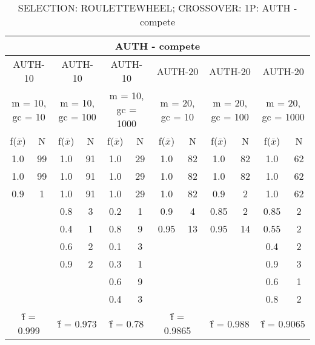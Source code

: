 \begin{table}[H]
	\centering
	\caption{SELECTION: ROULETTEWHEEL; CROSSOVER: 1P: AUTH - compete}
	\begin{adjustbox}{width=1\textwidth}
		\begin{tabular}{ |c|c||c|c||c|c||c|c||c|c||c|c| }
			\hline
			\multicolumn{12}{|c|}{AUTH - compete} \\
			\hline
			\multicolumn{2}{|c||}{AUTH-10} & \multicolumn{2}{c||}{AUTH-10} & \multicolumn{2}{c||}{AUTH-10} & \multicolumn{2}{c||}{AUTH-20} & \multicolumn{2}{c||}{AUTH-20} & \multicolumn{2}{c|}{AUTH-20}\\
			\hline
			\multicolumn{2}{|c||}{m = 10, gc = 10} & \multicolumn{2}{c||}{m = 10, gc = 100} & \multicolumn{2}{c||}{m = 10, gc = 1000} & \multicolumn{2}{c||}{m = 20, gc = 10} & \multicolumn{2}{c||}{m = 20, gc = 100} & \multicolumn{2}{c|}{m = 20, gc = 1000}\\
			\hline
			f($\bar{x}$) & N & f($\bar{x}$) & N & f($\bar{x}$) & N & f($\bar{x}$) & N & f($\bar{x}$) & N & f($\bar{x}$) & N\\
			\hline
			\hline
			1.0 & 99 & 1.0 & 91 & 1.0 & 29 & 1.0 & 82 & 1.0 & 82 & 1.0 & 62\\
			\hline
			1.0 & 99 & 1.0 & 91 & 1.0 & 29 & 1.0 & 82 & 1.0 & 82 & 1.0 & 62\\
			0.9 & 1 & 1.0 & 91 & 1.0 & 29 & 1.0 & 82 & 0.9 & 2 & 1.0 & 62\\
			&   & 0.8 & 3 & 0.2 & 1 & 0.9 & 4 & 0.85 & 2 & 0.85 & 2\\
			&   & 0.4 & 1 & 0.8 & 9 & 0.95 & 13 & 0.95 & 14 & 0.55 & 2\\
			&   & 0.6 & 2 & 0.1 & 3 &   &   &   &   & 0.4 & 2\\
			&   & 0.9 & 2 & 0.3 & 1 &   &   &   &   & 0.9 & 3\\
			&   &   &   & 0.6 & 9 &   &   &   &   & 0.6 & 1\\
			&   &   &   & 0.4 & 3 &   &   &   &   & 0.8 & 2\\
			\hline
			\multicolumn{2}{|c||}{\^{f} = 0.999} & \multicolumn{2}{c||}{\^{f} = 0.973} & \multicolumn{2}{c||}{\^{f} = 0.78} & \multicolumn{2}{c||}{\^{f} = 0.9865} & \multicolumn{2}{c||}{\^{f} = 0.988} & \multicolumn{2}{c|}{\^{f} = 0.9065}\\
			\hline
		\end{tabular}
	\end{adjustbox}
\end{table}
